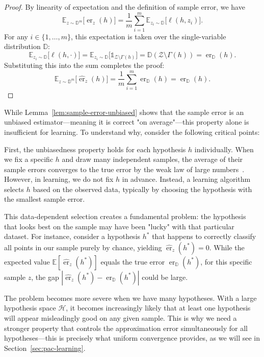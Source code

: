 \begin{proof}

    By linearity of expectation and the definition of sample error, we have
    \[
        \mathbb{E}_{z\sim\mathbb{D}^m}\bigl[\hat{\operatorname{er}}_{z}(h)\bigr] = \frac{1}{m}\sum_{i=1}^m \mathbb{E}_{z_i\sim\mathbb{D}}\bigl[\ell(h,z_i)\bigr].
    \]
    For any $i \in \{1, \dots, m\}$, this expectation is taken over the single-variable distribution $\mathbb{D}$:
    \[
        \mathbb{E}_{z_i\sim\mathbb{D}}\bigl[\ell(h,\cdot)\bigr] = \mathbb{E}_{z_i\sim\mathbb{D}}\bigl[\mathds{1}_{\mathcal{Z}\setminus\Gamma(h)}\bigr] = \mathbb{D}(\mathcal{Z}\setminus\Gamma(h))=\operatorname{er}_{\mathbb{D}}(h).
    \]
    Substituting this into the sum completes the proof:
    \[
        \mathbb{E}_{z\sim\mathbb{D}^m}\bigl[\hat{\operatorname{er}}_{z}(h)\bigr] = \frac{1}{m}\sum_{i=1}^m \operatorname{er}_{\mathbb{D}}(h) = \operatorname{er}_{\mathbb{D}}(h).
    \]
    \qedhere
\end{proof}

\begin{remarknl}
    \label{rem:unbiased-not-enough}
    
    While Lemma~\ref{lem:sample-error-unbiased} shows that the sample error is an unbiased estimator—meaning it is correct "on average"—this property alone is insufficient for learning. To understand why, consider the following critical points:
    
    First, the unbiasedness property holds for each hypothesis $h$ individually. When we fix a specific $h$ and draw many independent samples, the average of their sample errors converges to the true error by the weak law of large numbers~\cite[Chap.~9]{MeasureTheoryLeGall}. However, in learning, we do not fix $h$ in advance. Instead, a learning algorithm selects $h$ based on the observed data, typically by choosing the hypothesis with the smallest sample error.
    
    This data-dependent selection creates a fundamental problem: the hypothesis that looks best on the sample may have been "lucky" with that particular dataset. For instance, consider a hypothesis $h^*$ that happens to correctly classify all points in our sample purely by chance, yielding $\hat{\operatorname{er}}_z(h^*) = 0$. While the expected value $\mathbb{E}[\hat{\operatorname{er}}_z(h^*)]$ equals the true error $\operatorname{er}_{\mathbb{D}}(h^*)$, for this specific sample $z$, the gap $|\hat{\operatorname{er}}_z(h^*) - \operatorname{er}_{\mathbb{D}}(h^*)|$ could be large.
    
    The problem becomes more severe when we have many hypotheses. With a large hypothesis space $\mathcal{H}$, it becomes increasingly likely that at least one hypothesis will appear misleadingly good on any given sample. This is why we need a stronger property that controls the approximation error simultaneously for all hypotheses—this is precisely what uniform convergence provides, as we will see in Section~\ref{sec:pac-learning}.
\end{remarknl}

